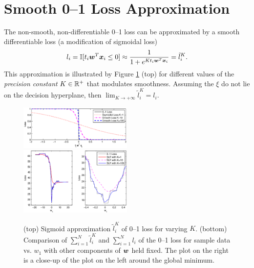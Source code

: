 \section{Smooth 0--1 Loss Approximation}
\label{cha:Smoothlossapprox}

The non-smooth, non-differentiable 0--1 loss can be
approximated by a smooth differentiable loss (a modification of sigmoidal loss)
$$l_i = \mathbb{I} [t_i \boldsymbol{w}^T \boldsymbol{x}_i \leq 0] \approx \frac{1}{1 + e^{Kt_i \boldsymbol{w}^T \boldsymbol{x}_i }} = \tilde{l}_i^K.$$
This approximation is illustrated by Figure \ref{fig:sla.smooth} (top) for different
values of the \emph{precision constant} $K \in \mathbb{R}^+$ that modulates smoothness.
Assuming the $\xi$ do not lie
on the decision hyperplane, then $\lim_{K \rightarrow +\infty} \tilde{l}_i^K = l_i$.

\begin{figure}[tp!]
\hspace{-3mm} \includegraphics[width=0.50\textwidth]{images/fig52_smooth.eps}
\vspace{-4mm} \hspace{-3mm} \includegraphics[width=0.50\textwidth]{images/fig53_smoothfunction.eps}
\vspace{-1mm}
\caption{ \footnotesize (top) Sigmoid approximation $\tilde{l}_i^K$ of
  0--1 loss for varying $K$.  (bottom) Comparison of $\sum_{i=1}^N
  \tilde{l}_i^K$ and $\sum_{i=1}^N l_i$ of the 0--1 loss for sample
  data vs. $w_1$ with other components of $\boldsymbol{w}$ held fixed.  The plot
  on the right is a close-up of the plot on the left around the global
  minimum.}
\label{fig:sla.smooth}
\vspace{-4mm}
\end{figure}

